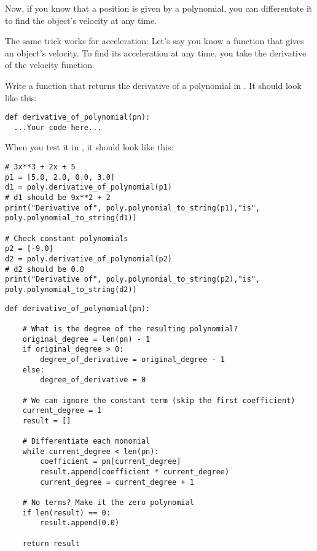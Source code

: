 Now, if you know that a position is given by a polynomial, you can
differentate it to find the object's velocity at any time.

The same trick works for acceleration: Let's say you know a function
that gives an object's velocity. To find its acceleration at any time,
you take the derivative of the velocity function.

\begin{Exercise}[title={Differentation of polynomials in Python}, label=pydiffpoly]
  Write a function that returns the derivative of a polynomial in . It should look like this:
\begin{Verbatim}
def derivative_of_polynomial(pn):
  ...Your code here...
\end{Verbatim}
When you test it in , it should look like this:
\begin{Verbatim}
# 3x**3 + 2x + 5
p1 = [5.0, 2.0, 0.0, 3.0]
d1 = poly.derivative_of_polynomial(p1)
# d1 should be 9x**2 + 2
print("Derivative of", poly.polynomial_to_string(p1),"is", poly.polynomial_to_string(d1))

# Check constant polynomials
p2 = [-9.0]
d2 = poly.derivative_of_polynomial(p2)
# d2 should be 0.0
print("Derivative of", poly.polynomial_to_string(p2),"is", poly.polynomial_to_string(d2))
\end{Verbatim}
\end{Exercise}
\begin{Answer}[ref=pydiffpoly]
\begin{Verbatim}
def derivative_of_polynomial(pn):

    # What is the degree of the resulting polynomial?
    original_degree = len(pn) - 1
    if original_degree > 0:
        degree_of_derivative = original_degree - 1
    else:
        degree_of_derivative = 0

    # We can ignore the constant term (skip the first coefficient)
    current_degree = 1
    result = []

    # Differentiate each monomial
    while current_degree < len(pn):
        coefficient = pn[current_degree]
        result.append(coefficient * current_degree)
        current_degree = current_degree + 1

    # No terms? Make it the zero polynomial
    if len(result) == 0:
        result.append(0.0)

    return result
\end{Verbatim}
\end{Answer}

